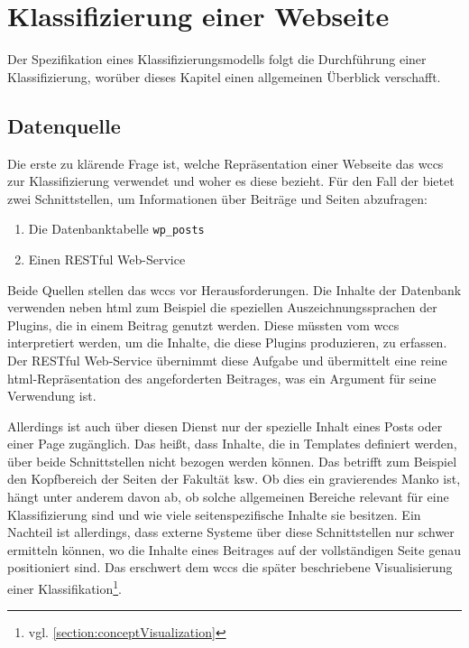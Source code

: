 \section{Klassifizierung einer Webseite}
    \label{section:conceptClassification}
    Der Spezifikation eines Klassifizierungsmodells folgt die Durchführung einer Klassifizierung,
    worüber dieses Kapitel einen allgemeinen Überblick verschafft.

    \subsection{Datenquelle}
        \label{section:conceptClassificationDataSource}
        Die erste zu klärende Frage ist, welche Repräsentation einer Webseite
        das \gls{wccs} zur Klassifizierung verwendet und woher es diese bezieht.
        Für den Fall der {\fernUni} bietet {\wordpress} zwei Schnittstellen,
        um Informationen über Beiträge und Seiten abzufragen:

        \begin{enumerate}
            \item Die Datenbanktabelle \texttt{wp\_posts} \cite{wordpress:Database}
            \item Einen RESTful Web-Service \cite{wordpress:RestAPI}
        \end{enumerate}

        Beide Quellen stellen das \gls{wccs} vor Herausforderungen.
        Die Inhalte der Datenbank verwenden neben \gls{html} zum Beispiel die speziellen
        Auszeichnungssprachen der Plugins, die in einem Beitrag genutzt werden.
        Diese müssten vom \gls{wccs} interpretiert werden,
        um die Inhalte, die diese Plugins produzieren, zu erfassen.
        Der RESTful Web-Service übernimmt diese Aufgabe und übermittelt
        eine reine \gls{html}-Repräsentation des angeforderten Beitrages,
        was ein Argument für seine Verwendung ist.

        Allerdings ist auch über diesen Dienst nur der spezielle Inhalt eines
        Posts oder einer Page zugänglich.
        Das heißt, dass Inhalte, die in Templates definiert werden, über beide
        Schnittstellen nicht bezogen werden können.
        Das betrifft zum Beispiel den Kopfbereich der Seiten der Fakultät \gls{ksw}.
        Ob dies ein gravierendes Manko ist, hängt unter anderem davon ab,
        ob solche allgemeinen Bereiche relevant für eine Klassifizierung sind
        und wie viele seitenspezifische Inhalte sie besitzen.
        Ein Nachteil ist allerdings, dass externe Systeme über diese Schnittstellen
        nur schwer ermitteln können, wo die Inhalte eines Beitrages auf der vollständigen Seite genau positioniert sind.
        Das erschwert dem \gls{wccs} die später beschriebene Visualisierung einer
        Klassifikation\footnote{vgl. \ref{section:conceptVisualization}}.       

